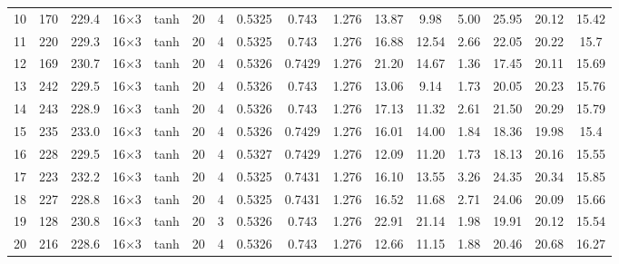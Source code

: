 \begin{tabular}{lcc cccc ccccccc cc}
  10 & 170 & 229.4 & 16$\times$3 & tanh & 20 & 4 & \num{0.5325} & \num{0.743} & \num{1.276} & 13.87 & 9.98 & 5.00 & 25.95 & \num{20.12} & \num{15.42} \\
  11 & 220 & 229.3 & 16$\times$3 & tanh & 20 & 4 & \num{0.5325} & \num{0.743} & \num{1.276} & 16.88 & 12.54 & 2.66 & 22.05 & \num{20.22} & \num{15.7} \\
  12 & 169 & 230.7 & 16$\times$3 & tanh & 20 & 4 & \num{0.5326} & \num{0.7429} & \num{1.276} & 21.20 & 14.67 & 1.36 & 17.45 & \num{20.11} & \num{15.69} \\
  13 & 242 & 229.5 & 16$\times$3 & tanh & 20 & 4 & \num{0.5326} & \num{0.743} & \num{1.276} & 13.06 & 9.14 & 1.73 & 20.05 & \num{20.23} & \num{15.76} \\
  14 & 243 & 228.9 & 16$\times$3 & tanh & 20 & 4 & \num{0.5326} & \num{0.743} & \num{1.276} & 17.13 & 11.32 & 2.61 & 21.50 & \num{20.29} & \num{15.79} \\
  15 & 235 & 233.0 & 16$\times$3 & tanh & 20 & 4 & \num{0.5326} & \num{0.7429} & \num{1.276} & 16.01 & 14.00 & 1.84 & 18.36 & \num{19.98} & \num{15.4} \\
  16 & 228 & 229.5 & 16$\times$3 & tanh & 20 & 4 & \num{0.5327} & \num{0.7429} & \num{1.276} & 12.09 & 11.20 & 1.73 & 18.13 & \num{20.16} & \num{15.55} \\
  17 & 223 & 232.2 & 16$\times$3 & tanh & 20 & 4 & \num{0.5325} & \num{0.7431} & \num{1.276} & 16.10 & 13.55 & 3.26 & 24.35 & \num{20.34} & \num{15.85} \\
  18 & 227 & 228.8 & 16$\times$3 & tanh & 20 & 4 & \num{0.5325} & \num{0.7431} & \num{1.276} & 16.52 & 11.68 & 2.71 & 24.06 & \num{20.09} & \num{15.66} \\
  19 & 128 & 230.8 & 16$\times$3 & tanh & 20 & 3 & \num{0.5326} & \num{0.743} & \num{1.276} & 22.91 & 21.14 & 1.98 & 19.91 & \num{20.12} & \num{15.54} \\
  20 & 216 & 228.6 & 16$\times$3 & tanh & 20 & 4 & \num{0.5326} & \num{0.743} & \num{1.276} & 12.66 & 11.15 & 1.88 & 20.46 & \num{20.68} & \num{16.27} \\
\bottomrule
\end{tabular}
